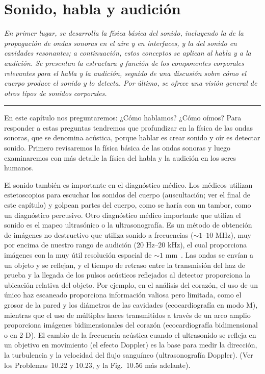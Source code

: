 \documentclass[12pt]{book}
\begin{document}
\setcounter{chapter}{9}

\chapter{Sonido, habla y audición}

\begin{flushleft}
    \textit{En primer lugar, se desarrolla la física básica del sonido, incluyendo la de la propagación de ondas sonoras en el aire y en interfaces, y la del sonido en cavidades resonantes; a continuación, estos conceptos se aplican al habla y a la audición. Se presentan la estructura y función de los componentes corporales relevantes para el habla y la audición, seguido de una discusión sobre cómo el cuerpo produce el sonido y lo detecta. Por último, se ofrece una visión general de otros tipos de sonidos corporales.}
\end{flushleft}

\hrule
\vspace{1em}

En este capítulo nos preguntaremos: ¿Cómo hablamos? ¿Cómo oímos? Para responder a estas preguntas tendremos que profundizar en la física de las ondas sonoras, que se denomina acústica, porque hablar es crear sonido y oír es detectar sonido. Primero revisaremos la física básica de las ondas sonoras y luego examinaremos con más detalle la física del habla y la audición en los seres humanos.

El sonido también es importante en el diagnóstico médico. Los médicos utilizan estetoscopios para escuchar los sonidos del cuerpo (auscultación; ver el final de este capítulo) y golpean partes del cuerpo, como se haría con un tambor, como un diagnóstico percusivo. Otro diagnóstico médico importante que utiliza el sonido es el mapeo ultrasónico o la ultrasonografía. Es un método de obtención de imágenes no destructivo que utiliza sonido a frecuencias ($\sim 1\text{--}10\text{ MHz}$), muy por encima de nuestro rango de audición ($20\text{ Hz}\text{--}20\text{ kHz}$), el cual proporciona imágenes con la muy útil resolución espacial de $\sim 1\text{ mm}$~\cite{51, 72}. Las ondas se envían a un objeto y se reflejan, y el tiempo de retraso entre la transmisión del haz de prueba y la llegada de los pulsos acústicos reflejados al detector proporciona la ubicación relativa del objeto. Por ejemplo, en el análisis del corazón, el uso de un único haz escaneado proporciona información valiosa pero limitada, como el grosor de la pared y los diámetros de las cavidades (ecocardiografía en modo M), mientras que el uso de múltiples haces transmitidos a través de un arco amplio proporciona imágenes bidimensionales del corazón (ecocardiografía bidimensional o en 2-D). El cambio de la frecuencia acústica cuando el ultrasonido se refleja en un objetivo en movimiento (el efecto Doppler) es la base para medir la dirección, la turbulencia y la velocidad del flujo sanguíneo (ultrasonografía Doppler). (Ver los Problemas~10.22 y 10.23, y la Fig.~10.56 más adelante).
\end{document}
